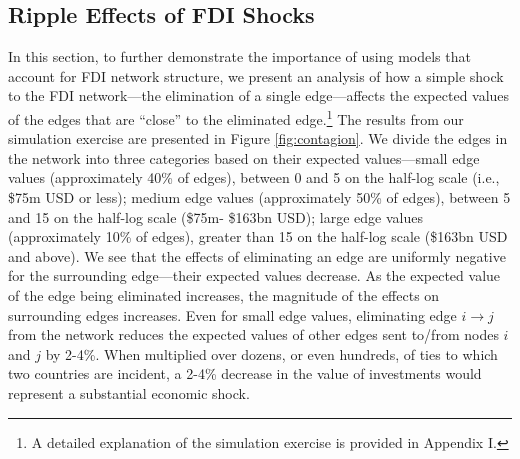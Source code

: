 \documentclass[reqno,onecolumn,letterpaper,12pt]{article}
\begin{document}
\subsection{Ripple Effects of FDI Shocks}\label{contagion}


In this section, to further demonstrate the importance of using models that account for FDI network structure, we present an analysis of how a simple shock to the FDI network---the elimination of a single edge---affects the expected values of the edges that are ``close'' to the eliminated edge.\footnote{A detailed explanation of the simulation exercise is provided in Appendix I.} The results from our simulation exercise are presented in Figure \ref{fig:contagion}. We divide the edges in the network into three categories based on their expected values---small edge values (approximately 40\% of edges), between 0 and 5 on the half-log scale (i.e., \$75m USD or less); medium edge values (approximately 50\% of edges), between 5 and 15 on the half-log scale (\$75m- \$163bn USD); large edge values (approximately 10\% of edges), greater than 15 on the half-log scale (\$163bn USD and above). We see that the effects of eliminating an edge are uniformly negative for the surrounding edge---their expected values decrease.  As the expected value of the edge being eliminated increases, the magnitude of the effects on surrounding edges increases. Even for small edge values, eliminating edge $i \rightarrow j$ from the network reduces the expected values of other edges sent to/from nodes $i$ and $j$ by 2-4\%. When multiplied over dozens, or even hundreds, of ties to which two countries are incident, a 2-4\% decrease in the value of investments would represent a substantial economic shock. %
\end{document}
